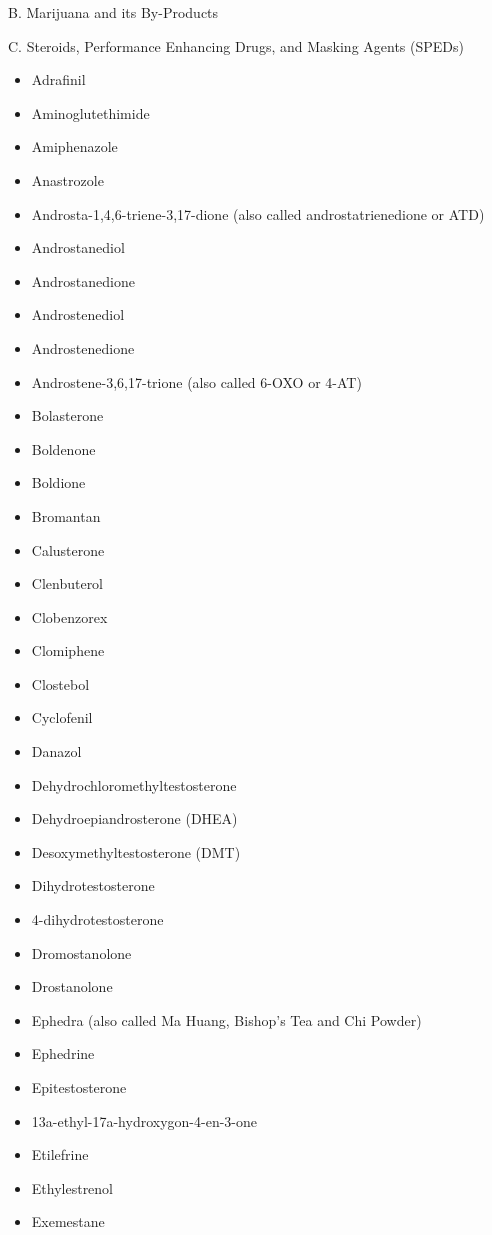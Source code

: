 \documentclass[
]{book}
\providecommand{\tightlist}{%
  \setlength{\itemsep}{0pt}\setlength{\parskip}{0pt}}
\begin{document}
B. Marijuana and its By-Products

C. Steroids, Performance Enhancing Drugs, and Masking Agents (SPEDs)

\begin{itemize}
\tightlist
\item
  Adrafinil
\item
  Aminoglutethimide
\item
  Amiphenazole
\item
  Anastrozole
\item
  Androsta-1,4,6-triene-3,17-dione (also called androstatrienedione or ATD)
\item
  Androstanediol
\item
  Androstanedione
\item
  Androstenediol
\item
  Androstenedione
\item
  Androstene-3,6,17-trione (also called 6-OXO or 4-AT)
\item
  Bolasterone
\item
  Boldenone
\item
  Boldione
\item
  Bromantan
\item
  Calusterone
\item
  Clenbuterol
\item
  Clobenzorex
\item
  Clomiphene
\item
  Clostebol
\item
  Cyclofenil
\item
  Danazol
\item
  Dehydrochloromethyltestosterone
\item
  Dehydroepiandrosterone (DHEA)
\item
  Desoxymethyltestosterone (DMT)
\item
  Dihydrotestosterone
\item
  4-dihydrotestosterone
\item
  Dromostanolone
\item
  Drostanolone
\item
  Ephedra (also called Ma Huang, Bishop's Tea and Chi Powder)
\item
  Ephedrine
\item
  Epitestosterone
\item
  13a-ethyl-17a-hydroxygon-4-en-3-one
\item
  Etilefrine
\item
  Ethylestrenol
\item
  Exemestane

\end{itemize}
\end{document}
